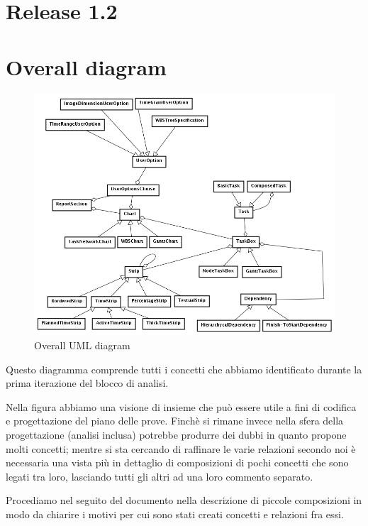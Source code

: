 \chapter*{Release \textbf{1.2}}

\chapter{Overall diagram}

\begin{figure}[h!] 
	\centering
	\includegraphics[width=1\textwidth]{../Milestone1-DomainModel/img/DomainModel.png}
	\caption{Overall UML diagram}
	\label{fig:overallDiagram} 
\end{figure}

Questo diagramma comprende tutti i concetti che abbiamo identificato durante la
prima iterazione del blocco di analisi. 

Nella figura abbiamo una visione di insieme che pu\`o essere utile a fini di
codifica e progettazione del piano delle prove. Finch\`e si rimane invece nella
sfera della progettazione (analisi inclusa) potrebbe produrre dei dubbi in
quanto propone molti concetti; mentre si sta cercando di raffinare le varie relazioni
secondo noi \`e necessaria una vista pi\`u in dettaglio di composizioni
di pochi concetti che sono legati tra loro, lasciando tutti gli altri ad una
loro commento separato.

Procediamo nel seguito del documento nella descrizione di piccole composizioni
in modo da chiarire i motivi per cui sono stati creati concetti e relazioni fra
essi.

